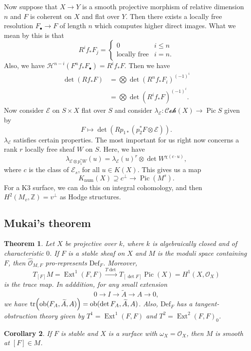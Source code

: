 \documentclass[leqno, openany]{memoir}
\newtheorem{thm}{Theorem}[section]
\newtheorem{cor}[thm]{Corollary}
\theoremstyle{definition}
\theoremstyle{remark}
\theoremstyle{plain}
\theoremstyle{definition}
\theoremstyle{remark}
\newcommand{\Z}{\mathbb{Z}}
\newcommand{\mc}[1]{\mathcal{#1}}
\newcommand{\mr}[1]{\mathrm{#1}}
\newcommand{\wt}[1]{\widetilde{#1}}
\newcommand{\wh}[1]{\widehat{#1}}
\DeclareMathOperator{\Ext}{Ext}
\DeclareMathOperator{\Pic}{Pic}
\begin{document}
Now suppose that $X \to Y$ is a smooth projective morphism of relative dimension $n$ and $F$ is coherent on $X$ and flat over $Y$. Then there exists a locally free resolution $F_{\bullet} \to F$ of length $n$ which computes higher direct images. What we mean by this is that 
\[ R^i f_* F_j = \begin{cases}
    0 & i \leq n \\
    \text{locally free} & i = n.
\end{cases}
\]
Also, we have $\mc{H}^{n-i}(F^n f_* F_{\bullet}) = R^i f_* F$. Then we have
\begin{align*}
    \det (R f_* F) &= \bigotimes \det(R^n f_* F_i)^{(-1)^i} \\
    &= \bigotimes \det (R^i f_* F)^{(-1)^i}.
\end{align*}
Now consider $\mc{E}$ on $S \times X$ flat over $S$ and consider $\lambda_{\mc{E}} \colon \mc{Coh}(X) \to \Pic S$ given by
\[ F \mapsto \det(R p_{1*} (p_2^* F \otimes \mc{E})). \]
$\lambda_{\mc{E}}$ satisfies certain properties. The most important for us right now concerns a rank $r$ locally free sheaf $W$ on $S$. Here, we have
\[ \lambda_{\mc{E} \otimes p_1^* W}(u) = \lambda_{\mc{E}}(u)^r \otimes \det W^{\chi(c \cdot u)}, \]
where $c$ is the class of $\mc{E}_s$, for all $u \in K(X)$. This gives us a map 
\[ K_{\mr{num}}(X) \supseteq c^{\perp} \to \Pic(M^s). \]
For a K3 surface, we can do this on integral cohomology, and then $H^2(M_v, \Z) = v^{\perp}$ as Hodge structures.

\subsection{Mukai's theorem}%
\label{sub:mukai_s_theorem}

\begin{thm}
    Let $X$ be projective over $k$, where $k$ is algebraically closed and of characteristic $0$. If $F$ is a stable sheaf on $X$ and $M$ is the moduli space containing $F$, then $\wh{\mc{O}}_{M, F}$ pro-represents $\mr{Def}_F$. Moreover, 
    \[ T_{[F]} M = \Ext^1(F, F) \xrightarrow{T \det} T_{[\det F]} \Pic(X) = H^1(X, \mc{O}_X) \]
    is the trace map. In adddition, for any small extension
    \[ 0 \to I \to \wt{A} \to A \to 0, \]
    we have $\tr(\mr{ob}(F_A, \wt{A}, A)) = \mr{ob}(\det F_A, \wt{A}, A)$. Also, $\mr{Def}_F$ has a tangent-obstruction theory given by $T^1 = \Ext^1(F, F)$ and $T^2 = \Ext^2(F, F)_0$.
\end{thm}

\begin{cor}
    If $F$ is stable and $X$ is a surface with $\omega_X = \mc{O}_X$, then $M$ is smooth at $[F] \in M$.
\end{cor}
\end{document}
